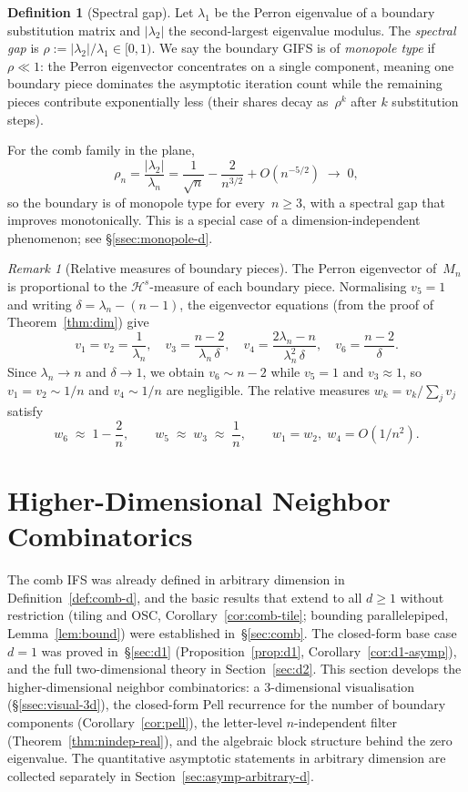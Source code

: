 \documentclass{amsart}
\theoremstyle{definition}
\newtheorem{definition}[theorem]{Definition}
\theoremstyle{remark}
\newtheorem{remark}[theorem]{Remark}
\begin{document}
\begin{definition}[Spectral gap]\label{def:spectral-gap}
Let $\lambda_1$ be the Perron eigenvalue of a boundary substitution
matrix and $|\lambda_2|$ the second-largest eigenvalue modulus.  The
\emph{spectral gap} is $\rho := |\lambda_2|/\lambda_1 \in [0,1)$.
We say the boundary GIFS is of \emph{monopole type} if
$\rho \ll 1$: the Perron eigenvector concentrates on a single
component, meaning one boundary piece dominates the asymptotic
iteration count while the remaining pieces contribute
exponentially less (their shares decay as~$\rho^k$ after $k$
substitution steps).
\end{definition}

For the comb family in the plane,
\[
  \rho_n = \frac{|\lambda_2|}{\lambda_n}
         = \frac{1}{\sqrt{n}} - \frac{2}{n^{3/2}} + O(n^{-5/2})
         \;\longrightarrow\; 0,
\]
so the boundary is of monopole type for every~$n \ge 3$, with
a spectral gap that improves monotonically.  This is a special
case of a dimension-independent phenomenon; see
\S\ref{ssec:monopole-d}.

\begin{remark}[Relative measures of boundary pieces]
\label{rem:measures}
The Perron eigenvector of~$M_n$ is proportional to the
$\mathcal{H}^s$-measure of each boundary piece.
Normalising $v_5 = 1$ and writing $\delta = \lambda_n - (n{-}1)$,
the eigenvector equations (from the proof of
Theorem~\ref{thm:dim}) give
\[
  v_1 = v_2 = \frac{1}{\lambda_n},\quad
  v_3 = \frac{n{-}2}{\lambda_n\,\delta},\quad
  v_4 = \frac{2\lambda_n - n}{\lambda_n^2\,\delta},\quad
  v_6 = \frac{n{-}2}{\delta}.
\]
Since $\lambda_n \to n$ and $\delta \to 1$, we obtain
$v_6 \sim n{-}2$ while $v_5 = 1$ and
$v_3 \approx 1$,
so $v_1 = v_2 \sim 1/n$ and $v_4 \sim 1/n$ are negligible.
The relative measures
$w_k = v_k / \sum_j v_j$ satisfy
\[
  w_6 \;\approx\; 1 - \frac{2}{n}, \qquad
  w_5 \;\approx\; w_3 \;\approx\; \frac{1}{n}, \qquad
  w_1 = w_2,\; w_4 = O(1/n^2).
\]
\end{remark}

\section{Higher-Dimensional Neighbor Combinatorics}
\label{sec:higherdim}

The comb IFS was already defined in arbitrary dimension in
Definition~\ref{def:comb-d}, and the basic results that extend
to all $d \ge 1$ without restriction (tiling and OSC,
Corollary~\ref{cor:comb-tile}; bounding parallelepiped,
Lemma~\ref{lem:bound}) were established in~\S\ref{sec:comb}.
The closed-form base case $d = 1$ was proved
in~\S\ref{sec:d1} (Proposition~\ref{prop:d1},
Corollary~\ref{cor:d1-asymp}), and the full two-dimensional theory
in Section~\ref{sec:d2}.
This section develops the higher-dimensional neighbor
combinatorics: a $3$-dimensional visualisation
(\S\ref{ssec:visual-3d}), the closed-form Pell recurrence for
the number of boundary components
(Corollary~\ref{cor:pell}), the letter-level $n$-independent
filter (Theorem~\ref{thm:nindep-real}), and the algebraic block
structure behind the zero eigenvalue.  The quantitative
asymptotic statements in arbitrary dimension are collected
separately in Section~\ref{sec:asymp-arbitrary-d}.
\end{document}

